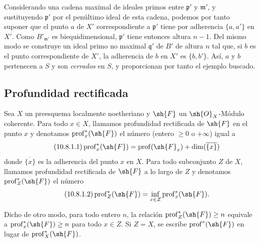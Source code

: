 \begin{env}[10.7.3]
Considerando una cadena maximal de ideales primos entre $\mathfrak{p}'$ y $\mathfrak{m}'$, y sustituyendo $\mathfrak{p}'$ por el penúltimo ideal de esta cadena, podemos por tanto suponer que el punto $a$ de $X'$ correspondiente a $\mathfrak{p}'$ tiene por adherencia $\{a,a'\}$ en $X'$.
Como $B'_{\mathfrak{m}'}$ es biequidimensional, $\mathfrak{p}'$ tiene entonces altura $n-1$.
Del mismo modo se construye un ideal primo no maximal $\mathfrak{q}'$ de $B'$ de altura $n$ tal que, si $b$ es el punto correspondiente de $X'$, la adherencia de $b$ en $X'$ es $\{b,b'\}$.
Así, $a$ y $b$ pertenecen a $S$ y son \emph{cerrados} en $S$, y proporcionan por tanto el ejemplo buscado.
\end{env}

\subsection{Profundidad rectificada}
\label{subsection:IV.10.8}

\begin{definition}[10.8.1]
\label{IV.10.8.1}
Sea $X$ un preesquema localmente noetheriano y $\sh{F}$ un $\sh{O}_X$-Módulo coherente.
Para todo $x\in X$, llamamos profundidad rectificada de $\sh{F}$ en el punto $x$ y denotamos $\operatorname{prof}^*_x(\sh{F})$ el número (entero $\geq 0$ o $+\infty$) igual a
\begin{equation}
\label{IV.10.8.1.1}
\tag{10.8.1.1}
\operatorname{prof}^*_x(\sh{F})=\operatorname{prof}(\sh{F}_x)+\dim(\overline{\{x\}})
\end{equation}
donde $\overline{\{x\}}$ es la adherencia del punto $x$ en $X$.
Para todo subconjunto $Z$ de $X$, llamamos profundidad rectificada de $\sh{F}$ a lo largo de $Z$ y denotamos $\operatorname{prof}^*_Z(\sh{F})$ el número
\begin{equation}
\label{IV.10.8.1.2}
\tag{10.8.1.2}
\operatorname{prof}^*_Z(\sh{F})=\inf_{x\in Z}\operatorname{prof}^*_x(\sh{F}).
\end{equation}
\end{definition}

Dicho de otro modo, para todo entero $n$, la relación $\operatorname{prof}^*_Z(\sh{F})\geq n$ equivale a $\operatorname{prof}^*_x(\sh{F})\geq n$ para todo $x\in Z$.
Si $Z=X$, se escribe $\operatorname{prof}^*(\sh{F})$ en lugar de $\operatorname{prof}^*_X(\sh{F})$.


